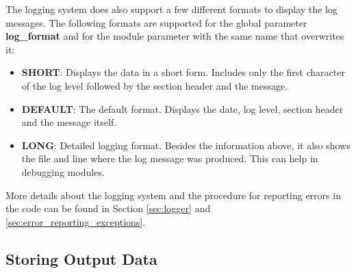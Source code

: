 The logging system does also support a few different formats to display the log messages. The following formats are supported for the global parameter \textbf{log\_format} and for the module parameter with the same name that overwrites it:
\begin{itemize}
\item \textbf{SHORT}: Displays the data in a short form. Includes only the first character of the log level followed by the section header and the message.
\item \textbf{DEFAULT}: The default format. Displays the date, log level, section header and the message itself. 
\item \textbf{LONG}: Detailed logging format. Besides the information above, it also shows the file and line where the log message was produced. This can help in debugging modules.
\end{itemize}

More details about the logging system and the procedure for reporting errors in the code can be found in Section \ref{sec:logger} and \ref{sec:error_reporting_exceptions}.

\subsection{Storing Output Data}
\wip
